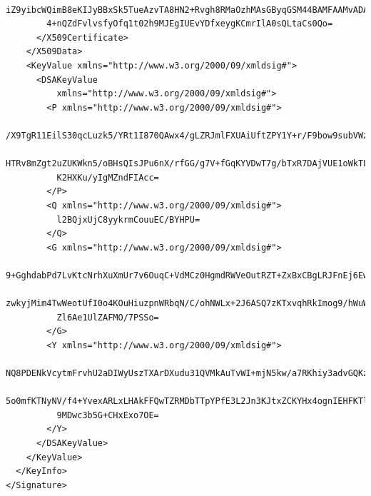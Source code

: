 \begin{lstlisting}
        iZ9yibcWQimB8eKIJyBBxSk5TueAzvTA8HN2+Rvgh8RMaOzhMAsGByqGSM44BAMFAAMvADAs
        4+nQZdFvlvsfyOfq1t02h9MJEgIUEvYDfxeygKCmrIlA0sQLtaCs0Qo=
      </X509Certificate>  
    </X509Data>  
    <KeyValue xmlns="http://www.w3.org/2000/09/xmldsig#">  
      <DSAKeyValue  
          xmlns="http://www.w3.org/2000/09/xmldsig#">  
        <P xmlns="http://www.w3.org/2000/09/xmldsig#">  
          /X9TgR11EilS30qcLuzk5/YRt1I870QAwx4/gLZRJmlFXUAiUftZPY1Y+r/F9bow9subVWz
          HTRv8mZgt2uZUKWkn5/oBHsQIsJPu6nX/rfGG/g7V+fGqKYVDwT7g/bTxR7DAjVUE1oWkTL
          K2HXKu/yIgMZndFIAcc=  
        </P>  
        <Q xmlns="http://www.w3.org/2000/09/xmldsig#">  
          l2BQjxUjC8yykrmCouuEC/BYHPU=  
        </Q>  
        <G xmlns="http://www.w3.org/2000/09/xmldsig#">  
          9+GghdabPd7LvKtcNrhXuXmUr7v6OuqC+VdMCz0HgmdRWVeOutRZT+ZxBxCBgLRJFnEj6Ew
          zwkyjMim4TwWeotUfI0o4KOuHiuzpnWRbqN/C/ohNWLx+2J6ASQ7zKTxvqhRkImog9/hWuW
          Zl6Ae1UlZAFMO/7PSSo=  
        </G>  
        <Y xmlns="http://www.w3.org/2000/09/xmldsig#">  
          NQ8PDENkVcytmFrvhU2aDIWyUszTXArDXudu31QVMkAuTvWI+mjN5kw/a7RKhiy3advGQKz
          5o0mfKTNyNV/f4+YvexARLxLHAkFFQwTZRMDbTTpYPfE3L2Jn3KJtxZCKYHx4ognIEHFKTl
          9MDwc3b5G+CHxExo7OE=  
        </Y>  
      </DSAKeyValue>  
    </KeyValue>  
  </KeyInfo>  
</Signature>
\end{lstlisting}

